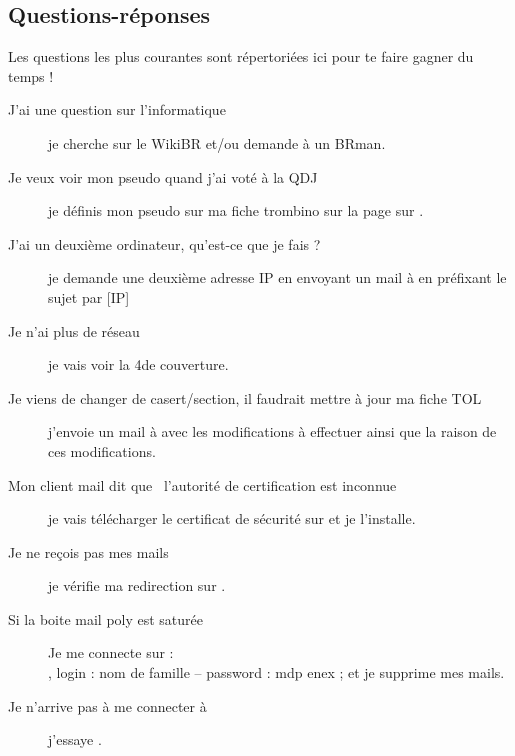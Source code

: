 \subsection{Questions-réponses}

Les questions les plus courantes sont répertoriées ici pour te faire gagner du temps !

\begin{description}

\item[J'ai une question sur l'informatique] je cherche sur le WikiBR et/ou demande \`a un BRman.

\item[Je veux voir mon pseudo quand j'ai voté à la QDJ] je définis mon pseudo sur ma fiche \linebreak trombino sur la page  sur \fkz.

\item[J'ai un deuxième ordinateur, qu'est-ce que je fais ?] je demande une deuxième adresse IP en envoyant un mail à  en préfixant le sujet par [IP] 

\item[Je n'ai plus de réseau] je vais voir la 4\ieme de couverture.

\item[Je viens de changer de casert/section, il faudrait mettre à jour ma fiche TOL] j'envoie \linebreak un mail à  avec les modifications à effectuer ainsi que la raison de ces
modifications.

\item[Mon client mail dit que \guillemotleft~l'autorité de certification est inconnue~\guillemotright ] je vais télécharger le certificat de sécurité sur  et je l'installe.

\item[Je ne reçois pas mes mails] je vérifie ma redirection sur .

\item[Si la boite mail poly est saturée] Je me connecte sur :\\
, 
login : nom de famille --
password : mdp enex ; et je supprime mes mails.


\item[Je n'arrive pas à me connecter à ] j'essaye .


\end{description}
